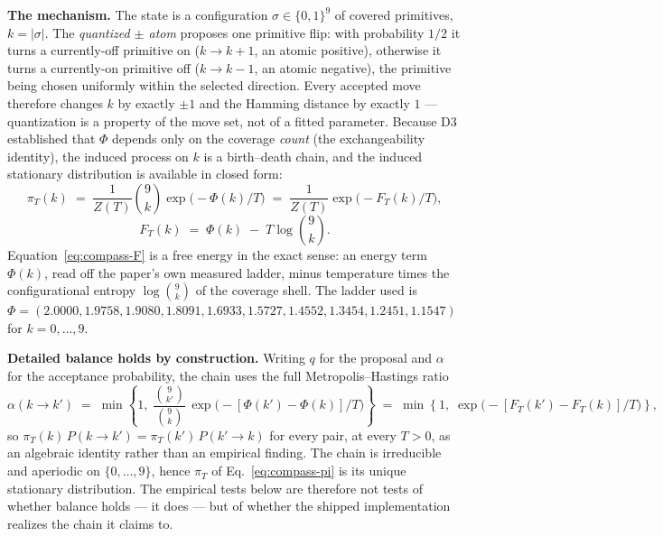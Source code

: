 \documentclass[11pt,a4paper]{article}
\theoremstyle{plain}
\theoremstyle{remark}
\theoremstyle{plain}
\begin{document}
\textbf{The mechanism.} The state is a configuration $\sigma\in\{0,1\}^9$ of
covered primitives, $k=|\sigma|$. The \emph{quantized $\pm$ atom} proposes one
primitive flip: with probability $1/2$ it turns a currently-off primitive on
($k\to k{+}1$, an atomic positive), otherwise it turns a currently-on primitive
off ($k\to k{-}1$, an atomic negative), the primitive being chosen uniformly
within the selected direction. Every accepted move therefore changes $k$ by
exactly $\pm1$ and the Hamming distance by exactly $1$ --- quantization is a
property of the move set, not of a fitted parameter. Because D3 established that
$\Phi$ depends only on the coverage \emph{count} (the exchangeability identity),
the induced process on $k$ is a birth--death chain, and the induced stationary
distribution is available in closed form:
\begin{equation}
\label{eq:compass-pi}
\pi_T(k)\;=\;\frac{1}{Z(T)}\binom{9}{k}\exp\!\big(-\Phi(k)/T\big)
\;=\;\frac{1}{Z(T)}\exp\!\big(-F_T(k)/T\big),
\end{equation}
\begin{equation}
\label{eq:compass-F}
F_T(k)\;=\;\Phi(k)\;-\;T\log\binom{9}{k}.
\end{equation}
Equation~\eqref{eq:compass-F} is a free energy in the exact sense: an energy term
$\Phi(k)$, read off the paper's own measured ladder, minus temperature times the
configurational entropy $\log\binom{9}{k}$ of the coverage shell. The ladder used
is $\Phi=(2.0000,1.9758,1.9080,1.8091,1.6933,1.5727,1.4552,1.3454,1.2451,1.1547)$
for $k=0,\dots,9$.

\textbf{Detailed balance holds by construction.} Writing $q$ for the proposal and
$\alpha$ for the acceptance probability, the chain uses the full
Metropolis--Hastings ratio
\begin{equation}
\label{eq:compass-mh}
\alpha(k\to k')\;=\;\min\!\left\{1,\;
\frac{\binom{9}{k'}}{\binom{9}{k}}\,
\exp\!\big(-[\Phi(k')-\Phi(k)]/T\big)\right\}
\;=\;\min\!\left\{1,\;\exp\!\big(-[F_T(k')-F_T(k)]/T\big)\right\},
\end{equation}
so $\pi_T(k)\,P(k\to k')=\pi_T(k')\,P(k'\to k)$ for every pair, at every $T>0$,
as an algebraic identity rather than an empirical finding. The chain is
irreducible and aperiodic on $\{0,\dots,9\}$, hence $\pi_T$ of
Eq.~\eqref{eq:compass-pi} is its unique stationary distribution. The empirical
tests below are therefore not tests of whether balance holds --- it does --- but
of whether the shipped implementation realizes the chain it claims to.
\end{document}
